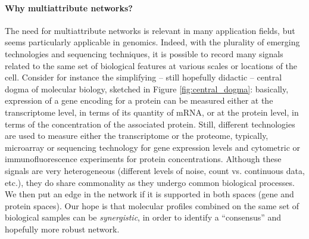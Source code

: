\paragraph*{Why multiattribute networks?}  The need for
multiattribute networks is relevant in many application fields, but
seems particularly applicable in genomics.  Indeed, with the plurality
of emerging technologies and sequencing techniques, it is possible to
record many signals related to the same set of biological features at
various scales or locations of the cell.  Consider for instance the
simplifying -- still hopefully didactic -- central dogma of molecular
biology, sketched in Figure \ref{fig:central_dogma}: basically,
expression of a gene encoding for a protein can be measured either at
the transcriptome level, in terms of its quantity of mRNA, or at the
protein level, in terms of the concentration of the associated
protein.  Still, different technologies are used to measure either the
transcriptome or the proteome, typically, microarray or sequencing
technology for gene expression levels and cytometric or
immunofluorescence experiments for protein concentrations.  Although
these signals are very heterogeneous (different levels of noise, count
vs. continuous data, etc.), they do share commonality as they undergo
common biological processes.  We then put an edge in the network if it
is supported in both spaces (gene and protein spaces).  Our hope is
that molecular profiles combined on the same set of biological samples
can be \textit{synergistic}, in order to identify a ``consensus'' and
hopefully more robust network.


